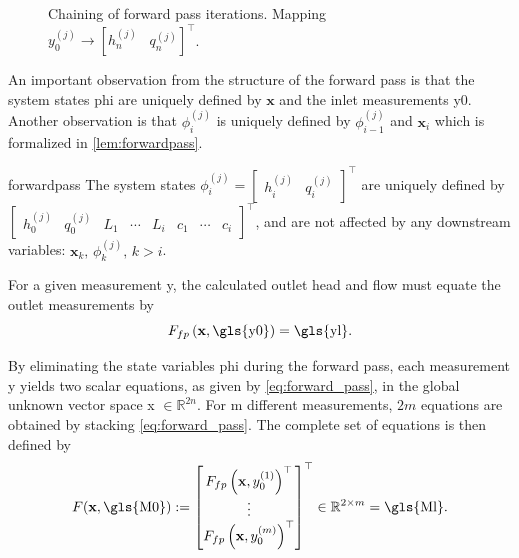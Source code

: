 \begin{figure}[h!]
    \centering
    
    \caption[Chaining of forward pass iterations]{Chaining of forward pass iterations. Mapping $y_0^{(j)} \to [h_{n}^{(j)}\;\;\;q_n^{(j)}]^\top$.}
    \label{fig:complete_forward_pass}
\end{figure}

An important observation from the structure of the forward pass is that the system states \gls{phi} are uniquely defined by $\mathbf{x}$ and the inlet measurements \gls{y0}. Another observation is that $\phi_i^{(j)}$ is uniquely defined by $\phi_{i-1}^{(j)}$ and $\mathbf{x}_i$ which is formalized in \autoref{lem:forwardpass}.

\vspace{3mm}
\begin{lemma}{}{forwardpass}
The system states $\phi_i^{(j)}=
\begin{bmatrix}
    h_i^{(j)} & q_i^{(j)}
\end{bmatrix}^\top$ 
are uniquely defined by $\begin{bmatrix}
h^{(j)}_0 & q^{(j)}_0 & L_1 & \cdots & L_i & c_1 & \cdots & c_i
\end{bmatrix}^\top$, and are not affected by any downstream variables: $\mathbf{x}_k,\, \phi_k^{(j)},\,k>i$.
\end{lemma}
\vspace{3mm}

For a given measurement \gls{y}, the calculated outlet head and flow must equate the outlet measurements by
\begin{equation}
    \label{eq:forward_pass}
    F_{fp}\left(\mathbf{x}, \text{\gls{y0}}\right) = \text{\gls{yl}}.
\end{equation}


By eliminating the state variables \gls{phi} during the forward pass, each measurement \gls{y} yields two scalar equations, as given by \cref{eq:forward_pass}, in the global unknown vector space \gls{x} $\in\mathbb{R}^{2n}$. For \gls{m} different measurements, $2m$ equations are obtained by stacking \cref{eq:forward_pass}. The complete set of equations is then defined by
\begin{equation}
\label{eq:main_function}
    F(\mathbf{x},\text{\gls{M0}}) := 
    \begin{bmatrix}
        F_{fp}\left(\mathbf{x}, y_0^{(1)}\right)^\top\\
        \vdots\\
        F_{fp}\left(\mathbf{x}, y_0^{(m)}\right)^\top
    \end{bmatrix}^\top \in \mathbb{R}^{2 \times m}
    = \text{\gls{Ml}}.
\end{equation}

